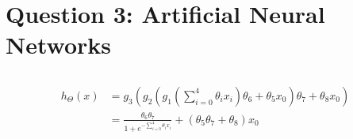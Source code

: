 \documentclass [11pt]{article}
\begin{document}
\section{Question 3: Artificial Neural Networks}
\subsection{}
\begin{equation}\label{eq:ANN_h}
\begin{split}
h_{\Theta}(x) & = g_{3}(g_{2}(g_{1}(\sum_{i=0}^{4}\theta_{i}x_{i})\theta_{6}+\theta_{5}x_{0})\theta_{7}+\theta_{8}x_{0}) \\
& = \frac{\theta_{6}\theta_{7}}{1+e^{-\sum_{i=0}^{4}\theta_{i}x_{i}}} + (\theta_{5}\theta_{7}+\theta_{8})x_{0}
\end{split}
\end{equation}
\end{document}
